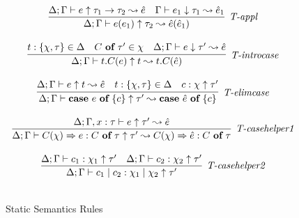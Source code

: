 \begin{figure}
\[\begin{array}{c}
\infer[\textit{T-appl}]
	{\Delta; \Gamma \vdash  e(e_1) \uparrow\tau_2  \leadsto \hat{e}(\hat{e}_1) } 
	{\Delta; \Gamma \vdash e \uparrow \tau_1 \rightarrow \tau_2  \leadsto \hat{e}  & \Gamma \vdash e_1 \downarrow \tau_1 \leadsto \hat{e}_1 }\\[3ex]

\infer[\textit{T-introcase}]
	{\Delta; \Gamma \vdash  t.C(e) \uparrow t  \leadsto t.C(\hat{e}) } 
	{t:\{\chi, \tau\} \in \Delta & C\ \keyw{of}\ \tau' \in \chi &\Delta; \Gamma \vdash e \downarrow \tau'  \leadsto \hat{e}}\\[3ex]

\infer[\textit{T-elimcase}]
	{\Delta; \Gamma \vdash  \keyw{case}~e~\keyw{of}~\{ c \} \uparrow\tau'  \leadsto \keyw{case}~\hat{e}~\keyw{of}~\{ c \} } 
	{\Delta; \Gamma \vdash e \uparrow t  \leadsto \hat{e}  & t:\{ \chi,\tau\} \in \Delta & c:\chi \uparrow \tau'}\\[3ex]

\infer[\textit{T-casehelper1}]
	{\Delta; \Gamma \vdash  C(\chi)\Rightarrow e : C\ \keyw{of}\ \tau \uparrow \tau' \leadsto C(\chi)\Rightarrow \hat{e} : C\ \keyw{of}\ \tau} 
	{\Delta; \Gamma, x:\tau \vdash e \uparrow \tau' \leadsto \hat{e}}\\[3ex]

\infer[\textit{T-casehelper2}]
	{\Delta; \Gamma \vdash  c_1 \bnfalt c_2: \chi_1 \bnfalt \chi_2 \uparrow \tau' } 
	{\Delta; \Gamma \vdash c_1:\chi_1 \uparrow \tau' & \Delta; \Gamma \vdash c_2:\chi_2 \uparrow \tau'}\\[3ex]


\end{array}
\]
\caption{Static Semantics Rules}
\end{figure}

